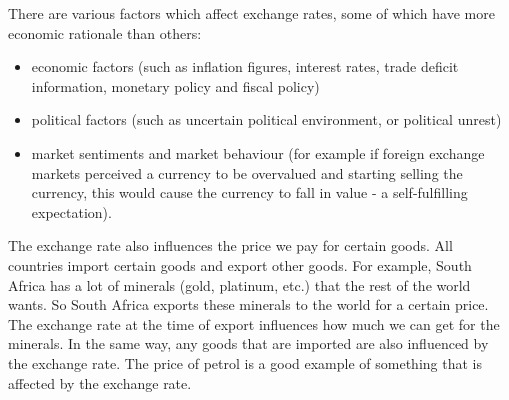         \label{m39335*id68568}There are various factors which affect exchange rates, some of which have more economic rationale than others:\par 
        \label{m39335*id68573}\begin{itemize}[noitemsep]
            \label{m39335*uid18}\item economic factors (such as inflation figures, interest rates, trade deficit information, monetary policy and fiscal policy)
\label{m39335*uid19}\item political factors (such as uncertain political environment, or political unrest)
\label{m39335*uid20}\item market sentiments and market behaviour (for example if foreign exchange markets perceived a currency to be overvalued and starting selling the currency, this would cause the currency to fall in value - a self-fulfilling expectation).
\end{itemize}
        
\label{m39335*id7324}The exchange rate also influences the price we pay for certain goods. All countries import certain goods and export other goods. For example, South Africa has a lot of minerals (gold, platinum, etc.) that the rest of the world wants. So South Africa exports these minerals to the world for a certain price. The exchange rate at the time of export influences how much we can get for the minerals. In the same way, any goods that are imported are also influenced by the exchange rate. The price of petrol is a good example of something that is affected by the exchange rate. 
\par 
  
\label{m39335*secfhsst!!!underscore!!!id876}
